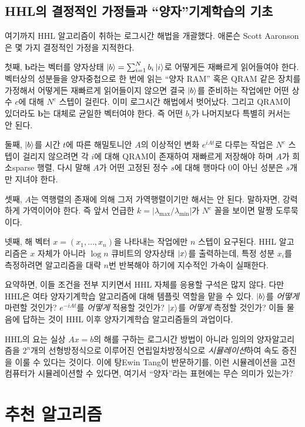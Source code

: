\documentclass[a4paper,atbegshi,chapter,itemph,hidelinks]{oblivoir}
\begin{document}
\section{HHL의 결정적인 가정들과 ``양자''기계학습의 기초}
여기까지 HHL 알고리즘이 취하는 로그시간 해법을 개괄했다. 애론슨{\footnotesize
Scott Aaronson}은 몇 가지 결정적인 가정을 지적한다.

첫째, $\mathbf{b}$라는 벡터를 양자상태 $\ket{b}=\sum_{i=1}^Nb_i\ket{i}$로 어떻게든
재빠르게 읽어들여야 한다. 벡터상의 성분들을 양자중첩으로 한 번에 읽는
``양자 RAM'' 혹은 QRAM 같은 장치를 가정해서 어떻게든 재빠르게 읽어들이지
않으면 결국 $\ket{b}$를 준비하는 작업에만 어떤 상수 $c$에 대해 $N^c$ 스텝이
걸린다. 이미 로그시간 해법에서 벗어났다. 그리고 QRAM이 있더라도 $\mathbf{b}$는
대체로 균일한 벡터여야 한다. 즉 어떤 $b_i$가 나머지보다 특별히 커서는 안 된다.

둘째, $\ket{b}$를 시간 $t$에 따른 해밀토니안 $A$의 이상적인 변화
$e^{iAt}$로 다루는 작업은 $N^c$ 스텝이 걸리지 않으려면 각 $i$에 대해 QRAM이
존재하여 재빠르게 저장해야 하며 $A$가 희소{\footnotesize sparse} 행렬, 다시
말해 $A$가 어떤 고정된 정수 $s$에 대해 행마다 $0$이 아닌 성분은 $s$개만 지녀야
한다.

셋째, $A$는 역행렬의 존재에 의해 그저 가역행렬이기만 해서는 안 된다. 말하자면,
강력하게 가역이어야 한다. 즉 앞서 언급한 $k=|\lambda_{\max}/\lambda_{\min}|$가
$N^c$ 꼴을 보이면 말짱 도루묵이다.

넷째, 해 벡터 $x=(x_1,\ldots,x_n)$을 나타내는 작업에만 $n$ 스텝이 요구된다.
HHL 알고리즘은 $x$ 자체가 아니라 $\log n$ 큐비트의 양자상태 $\ket{x}$를
출력하는데, 특정 성분 $x_i$를 측정하려면 알고리즘을 대략 $n$번 반복해야
하기에 지수적인 가속이 실패한다.

요약하면, 이들 조건을 전부 지키면서 HHL 자체를 응용할 구석은 많지 않다. 다만
HHL은 여타 양자기계학습 알고리즘에 대해 템플릿 역할을 맡을 수 있다. $\ket{b}$를
\emph{어떻게} 마련할 것인가? $e^{-iAt}$를 \emph{어떻게} 적용할 것인가? 
$\ket{x}$를 \emph{어떻게} 측정할 것인가? 이들 물음에 답하는 것이 HHL 이후
양자기계학습 알고리즘들의 과업이다. 

HHL의 요는 실상 $Ax=b$의 해를 구하는 로그시간 방법이 아니라 임의의 양자알고리즘을
$2^n$개의 선형방정식으로 이루어진 연립일차방정식으로 \emph{시뮬레이션}하여  
속도 증진을 이룰 수 있다는 것이다. 이에 탕{\footnotesize Ewin Tang}이 반문하기를,
이런 시뮬레이션을 고전 컴퓨터가 시뮬레이션할 수 있다면, 여기서 ``양자''라는 
표현에는 무슨 의미가 있는가?
\chapter{추천 알고리즘}
\end{document}
